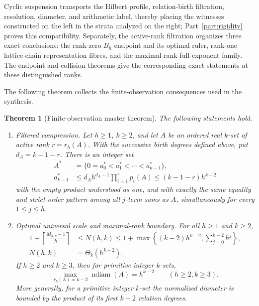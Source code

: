 \documentclass[11pt,reqno]{amsart}
\newtheorem{theorem}{Theorem}[section]
\theoremstyle{definition}
\theoremstyle{remark}
\newcommand{\ndiam}{\operatorname{ndiam}}
\begin{document}
Cyclic suspension transports the Hilbert profile, relation-birth filtration,
resolution, diameter, and arithmetic label, thereby placing the witnesses
constructed on the left in the strata analyzed on the right;
Part~\ref{part:rigidity} proves this compatibility.  Separately, the
active-rank filtration organizes three exact conclusions: the rank-zero
$B_h$ endpoint and its optimal ruler, rank-one lattice-chain representation
fibres, and the maximal-rank full-exponent family.  The endpoint and collision
theorems give the corresponding exact statements at these distinguished ranks.

The following theorem collects the finite-observation consequences used in
the synthesis.

\begin{theorem}[Finite-observation master theorem]
\label{thm:active-structure-intro}
The following statements hold.
\begin{enumerate}[label=\textup{(\roman*)}]
\item \emph{Filtered compression.}
Let $h\geq1$, $k\geq2$, and let $A$ be an ordered real $k$-set of
active rank $r=r_h(A)$.  With the successive birth degrees defined above,
put $d_A=k-1-r$.  There is an integer set
\[
 \begin{aligned}
 A^*&=\{0=a_0^*<a_1^*<\cdots<a_{k-1}^*\},\\
 a_{k-1}^*
 &\leq d_Ah^{d_A-1}\prod_{i=1}^r p_i(A)
 \leq(k-1-r)h^{k-2}
 \end{aligned}
\]
with the empty product understood as one, and with exactly the same equality
and strict-order pattern among all $j$-term
sums as $A$, simultaneously for every $1\leq j\leq h$.

\item \emph{Optimal universal scale and maximal-rank boundary.}
For all $h\geq1$ and $k\geq2$,
\begin{equation}\label{eq:compression-intro}
\begin{aligned}
 1+\left\lceil\frac{M_{h,k}-1}{h}\right\rceil
 &\leq N(h,k)
 \leq1+\max\left\{(k-2)h^{k-2},\sum_{j=0}^{k-2}h^j\right\},\\
 N(h,k)&=\Theta_k(h^{k-2}).
\end{aligned}
\end{equation}
If $h\geq2$ and $k\geq3$, then for primitive integer $k$-sets,
\begin{equation}\label{eq:maximal-rank-core-intro}
 \max_{r_h(A)=k-2}\ndiam(A)=h^{k-2}
 \qquad(h\geq2,k\geq3).
\end{equation}
More generally, for a primitive integer $k$-set the normalized diameter is
bounded by the product of its first $k-2$ relation degrees.


\end{enumerate}
\end{theorem}
\end{document}
